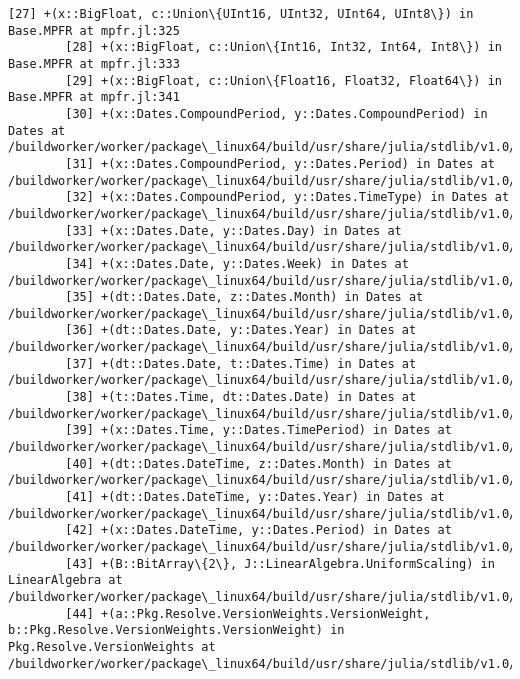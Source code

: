 \documentclass[11pt]{article}
\begin{document}
\begin{Verbatim}[commandchars=\\\{\}]
        [27] +(x::BigFloat, c::Union\{UInt16, UInt32, UInt64, UInt8\}) in Base.MPFR at mpfr.jl:325
        [28] +(x::BigFloat, c::Union\{Int16, Int32, Int64, Int8\}) in Base.MPFR at mpfr.jl:333
        [29] +(x::BigFloat, c::Union\{Float16, Float32, Float64\}) in Base.MPFR at mpfr.jl:341
        [30] +(x::Dates.CompoundPeriod, y::Dates.CompoundPeriod) in Dates at /buildworker/worker/package\_linux64/build/usr/share/julia/stdlib/v1.0/Dates/src/periods.jl:349
        [31] +(x::Dates.CompoundPeriod, y::Dates.Period) in Dates at /buildworker/worker/package\_linux64/build/usr/share/julia/stdlib/v1.0/Dates/src/periods.jl:347
        [32] +(x::Dates.CompoundPeriod, y::Dates.TimeType) in Dates at /buildworker/worker/package\_linux64/build/usr/share/julia/stdlib/v1.0/Dates/src/periods.jl:385
        [33] +(x::Dates.Date, y::Dates.Day) in Dates at /buildworker/worker/package\_linux64/build/usr/share/julia/stdlib/v1.0/Dates/src/arithmetic.jl:78
        [34] +(x::Dates.Date, y::Dates.Week) in Dates at /buildworker/worker/package\_linux64/build/usr/share/julia/stdlib/v1.0/Dates/src/arithmetic.jl:76
        [35] +(dt::Dates.Date, z::Dates.Month) in Dates at /buildworker/worker/package\_linux64/build/usr/share/julia/stdlib/v1.0/Dates/src/arithmetic.jl:59
        [36] +(dt::Dates.Date, y::Dates.Year) in Dates at /buildworker/worker/package\_linux64/build/usr/share/julia/stdlib/v1.0/Dates/src/arithmetic.jl:32
        [37] +(dt::Dates.Date, t::Dates.Time) in Dates at /buildworker/worker/package\_linux64/build/usr/share/julia/stdlib/v1.0/Dates/src/arithmetic.jl:20
        [38] +(t::Dates.Time, dt::Dates.Date) in Dates at /buildworker/worker/package\_linux64/build/usr/share/julia/stdlib/v1.0/Dates/src/arithmetic.jl:24
        [39] +(x::Dates.Time, y::Dates.TimePeriod) in Dates at /buildworker/worker/package\_linux64/build/usr/share/julia/stdlib/v1.0/Dates/src/arithmetic.jl:82
        [40] +(dt::Dates.DateTime, z::Dates.Month) in Dates at /buildworker/worker/package\_linux64/build/usr/share/julia/stdlib/v1.0/Dates/src/arithmetic.jl:52
        [41] +(dt::Dates.DateTime, y::Dates.Year) in Dates at /buildworker/worker/package\_linux64/build/usr/share/julia/stdlib/v1.0/Dates/src/arithmetic.jl:28
        [42] +(x::Dates.DateTime, y::Dates.Period) in Dates at /buildworker/worker/package\_linux64/build/usr/share/julia/stdlib/v1.0/Dates/src/arithmetic.jl:80
        [43] +(B::BitArray\{2\}, J::LinearAlgebra.UniformScaling) in LinearAlgebra at /buildworker/worker/package\_linux64/build/usr/share/julia/stdlib/v1.0/LinearAlgebra/src/uniformscaling.jl:88
        [44] +(a::Pkg.Resolve.VersionWeights.VersionWeight, b::Pkg.Resolve.VersionWeights.VersionWeight) in Pkg.Resolve.VersionWeights at /buildworker/worker/package\_linux64/build/usr/share/julia/stdlib/v1.0/Pkg/src/resolve/VersionWeights.jl:26

\end{Verbatim}
\end{document}
